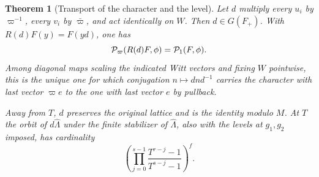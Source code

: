 \documentclass[a4paper,11pt]{article}
\newtheorem{theorem}[proposition]{Theorem}
\theoremstyle{definition}
\theoremstyle{remark}
\numberwithin{equation}{section}
\begin{document}
\begin{theorem}[Transport of the character and the level]\label{thm:full95}
Let \(d\) multiply every \(u_i\) by \(\varpi^{-1}\), every \(v_i\)
by \(\bar\varpi\), and act identically on \(W\). Then \(d\in G(F_+)\).
With \(R(d)F(y)=F(yd)\), one has
\begin{equation}
            {\cal P}_{\varpi}(R(d)F,\phi)={\cal P}_1(F,\phi).
            \label{eq:full95}
\end{equation}
Among diagonal maps scaling the indicated Witt vectors and fixing
\(W\) pointwise, this is the unique one for which conjugation
\(n\mapsto d n d^{-1}\) carries the character with last vector
\(\varpi e\) to the one with last vector \(e\) by pullback.

Away from \(T\), \(d\) preserves the original lattice and is the
identity modulo \(M\). At \(T\) the orbit of \(d\widehat\Lambda\)
under the finite stabilizer of \(\widehat\Lambda\), also with the
levels at \(g_1,g_2\) imposed, has cardinality
\begin{equation}
       \left(\prod_{j=0}^{s-1}\frac{T^{r-j}-1}{T^{s-j}-1}\right)^f .
       \label{eq:grass95}
\end{equation}
\end{theorem}
\end{document}
